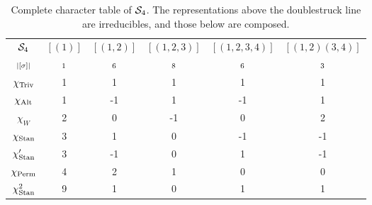 {\begin{example}
	\begin{table}[hbt!]
		\centering
		\begin{tabular}{c | c c c c c}
			$\mathcal{S}_4$         & $[(1)]$   & $[(1,2)]$  & $[(1,2,3)]$ & $[(1,2,3,4)]$ & $[(1,2)(3,4)]$ \\
			$\scriptstyle|[\sigma]|$    & $\scriptstyle 1$ & $\scriptstyle 6$ & $\scriptstyle 8$ & $\scriptstyle 6$  & $\scriptstyle 3$      \\ \hline
			$\chi_{\text{Triv}}$       & 1       & 1       & 1       & 1        & 1            \\
			$\chi_{\text{Alt}}$       & 1       & -1      & 1       & -1       & 1            \\
			$\chi_W$       & 2       & 0       & -1      & 0        & 2            \\
			$\chi_{\text{Stan}}$       & 3       & 1       & 0       & -1       & -1           \\
			$\chi'_{\text{Stan}}$ & 3       & -1      & 0       & 1        & -1           \\ \hline\hline
			$\chi_{\text{Perm}}$       & 4       & 2       & 1       & 0        & 0            \\
			$\chi_{\text{Stan}}^2$ & 9       & 1       & 0       & 1        & 1            \\
		\end{tabular}
		\caption{Complete character table of $\mathcal{S}_4$. The representations above the doublestruck line are irreducibles, and those below are composed.}
		\label{table:completecharS4}
	\end{table}
\end{example}


}
